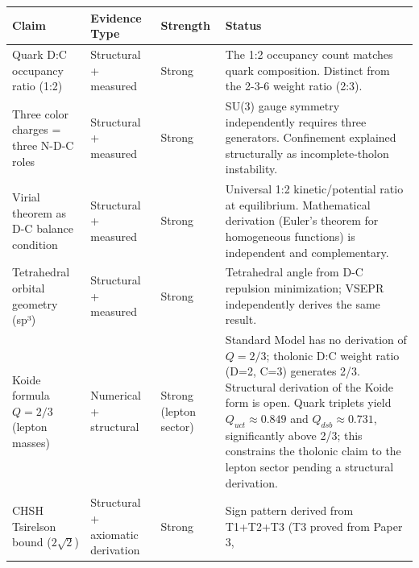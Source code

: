 \documentclass[
  11pt,
  letterpaper,
]{article}
\begin{document}
\begin{longtable}[]{@{}
  >{\raggedright\arraybackslash}p{}
  >{\raggedright\arraybackslash}p{}
  >{\raggedright\arraybackslash}p{}
  >{\raggedright\arraybackslash}p{}@{}}
\toprule\noalign{}
\begin{minipage}[b]{\linewidth}\raggedright
Claim
\end{minipage} & \begin{minipage}[b]{\linewidth}\raggedright
Evidence Type
\end{minipage} & \begin{minipage}[b]{\linewidth}\raggedright
Strength
\end{minipage} & \begin{minipage}[b]{\linewidth}\raggedright
Status
\end{minipage} \\
\midrule\noalign{}
\endhead
\bottomrule\noalign{}
\endlastfoot
Quark D:C occupancy ratio (1:2) & Structural + measured & Strong & The
1:2 occupancy count matches quark composition. Distinct from the 2-3-6
weight ratio (2:3). \\
Three color charges = three N-D-C roles & Structural + measured & Strong
& SU(3) gauge symmetry independently requires three generators.
Confinement explained structurally as incomplete-tholon instability. \\
Virial theorem as D-C balance condition & Structural + measured & Strong
& Universal 1:2 kinetic/potential ratio at equilibrium. Mathematical
derivation (Euler's theorem for homogeneous functions) is independent
and complementary. \\
Tetrahedral orbital geometry (sp³) & Structural + measured & Strong &
Tetrahedral angle from D-C repulsion minimization; VSEPR independently
derives the same result. \\
Koide formula \(Q = 2/3\) (lepton masses) & Numerical + structural &
Strong (lepton sector) & Standard Model has no derivation of
\(Q = 2/3\); tholonic D:C weight ratio (D=2, C=3) generates 2/3.
Structural derivation of the Koide form is open. Quark triplets yield
\(Q_{uct} \approx 0.849\) and \(Q_{dsb} \approx 0.731\), significantly
above 2/3; this constrains the tholonic claim to the lepton sector
pending a structural derivation. \\
CHSH Tsirelson bound (\(2\sqrt{2}\)) & Structural + axiomatic derivation
& Strong & Sign pattern derived from T1+T2+T3 (T3 proved from Paper 3,

\end{longtable}
\end{document}
